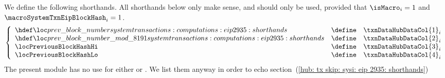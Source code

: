 We define the following shorthands.
All shorthands below only make sense, and should only be used, provided that
$\isMacro               _{i} = 1$ and
$\macroSystemTxnEipBlockHash _{i} = 1$.
\[
	\left\{ \begin{array}{lcl}
		\locPreviousBlockNumber            & \define & \txnDataHubDataCol {1} _{i} \\
		\locPreviousBlockNumberModuloPrime & \define & \txnDataHubDataCol {2} _{i} \\
		\locPreviousBlockHashHi            & \define & \txnDataHubDataCol {3} _{i} \\
		\locPreviousBlockHashLo            & \define & \txnDataHubDataCol {4} _{i} \\
	\end{array} \right.
\]
\saNote{}
The present module has no use for either
\locPreviousBlockHashHi{} or
\locPreviousBlockHashLo{}.
We list them anyway in order to echo
section~(\ref{hub: tx skip: sysi: eip 2935: shorthands})
